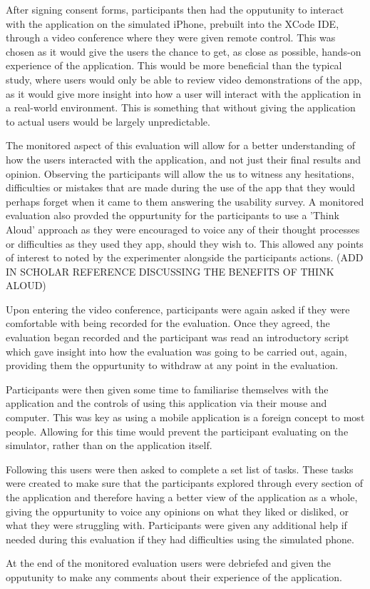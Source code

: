 \documentclass{l4proj}
\begin{document}
After signing consent forms, participants then had the opputunity to interact with the application on the simulated iPhone, 
prebuilt into the XCode IDE, through a video conference where they were given remote control. This was chosen as it 
would give the users the chance to get, as close as possible, hands-on experience of the application. This would be 
more beneficial than the typical study, where users would only be able to review video demonstrations of the app, as 
it would give more insight into how a user will interact with the application in a real-world environment. This 
is something that without giving the application to actual users would be largely unpredictable. 
\par 
The monitored aspect of this evaluation will allow for a better understanding of how the users interacted
with the application, and not just their final results and opinion. Observing the participants will allow the us to 
witness any hesitations, difficulties or mistakes that are made during the use of the app that they would 
perhaps forget when it came to them answering the usability survey. A monitored evaluation also provded the oppurtunity
for the participants to use a 'Think Aloud' approach as they were encouraged to voice any of their thought processes
or difficulties as they used they app, should they wish to. This allowed any points of interest to noted by the 
experimenter alongside the participants actions. (ADD IN SCHOLAR REFERENCE DISCUSSING THE BENEFITS OF THINK ALOUD)
\par 
Upon entering the video conference, participants were again asked if they were comfortable with being recorded for the evaluation. 
Once they agreed, the evaluation began recorded and the participant was read an introductory script which gave insight into how
the evaluation was going to be carried out, again, providing them the oppurtunity to withdraw at any point in the evaluation.
\par 
Participants were then given some time to familiarise themselves with the application and the controls of using this application
via their mouse and computer. This was key as using a mobile application is a foreign concept to most people. Allowing for 
this time would prevent the participant evaluating on the simulator, rather than on the application itself. 
\par 
Following this users were then asked to complete a set list of tasks. These tasks were created to make sure that the participants 
explored through every section of the application and therefore having a better view of the application as a whole, giving the oppurtunity
to voice any opinions on what they liked or disliked, or what they were struggling with. Participants were given any additional help 
if needed during this evaluation if they had difficulties using the simulated phone.
\par 
At the end of the monitored evaluation users were debriefed and given the opputunity to make any comments about their experience
of the application.
\end{document}
